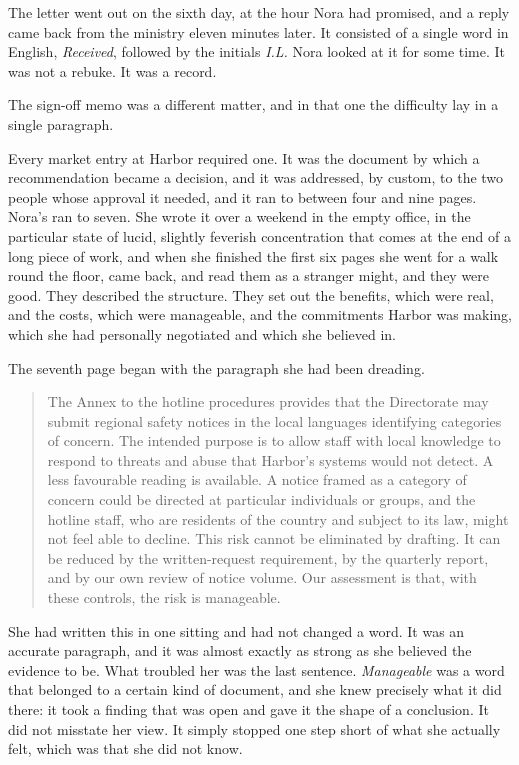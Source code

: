 The letter went out on the sixth day, at the hour Nora had promised, and a reply came back from the ministry eleven minutes later. It consisted of a single word in English, \emph{Received}, followed by the initials \emph{I.L.} Nora looked at it for some time. It was not a rebuke. It was a record.

The sign-off memo was a different matter, and in that one the difficulty lay in a single paragraph.

Every market entry at Harbor required one. It was the document by which a recommendation became a decision, and it was addressed, by custom, to the two people whose approval it needed, and it ran to between four and nine pages. Nora's ran to seven. She wrote it over a weekend in the empty office, in the particular state of lucid, slightly feverish concentration that comes at the end of a long piece of work, and when she finished the first six pages she went for a walk round the floor, came back, and read them as a stranger might, and they were good. They described the structure. They set out the benefits, which were real, and the costs, which were manageable, and the commitments Harbor was making, which she had personally negotiated and which she believed in.

The seventh page began with the paragraph she had been dreading.

\begin{quote}
The Annex to the hotline procedures provides that the Directorate may submit regional safety notices in the local languages identifying categories of concern. The intended purpose is to allow staff with local knowledge to respond to threats and abuse that Harbor's systems would not detect. A less favourable reading is available. A notice framed as a category of concern could be directed at particular individuals or groups, and the hotline staff, who are residents of the country and subject to its law, might not feel able to decline. This risk cannot be eliminated by drafting. It can be reduced by the written-request requirement, by the quarterly report, and by our own review of notice volume. Our assessment is that, with these controls, the risk is manageable.
\end{quote}

She had written this in one sitting and had not changed a word. It was an accurate paragraph, and it was almost exactly as strong as she believed the evidence to be. What troubled her was the last sentence. \emph{Manageable} was a word that belonged to a certain kind of document, and she knew precisely what it did there: it took a finding that was open and gave it the shape of a conclusion. It did not misstate her view. It simply stopped one step short of what she actually felt, which was that she did not know.

